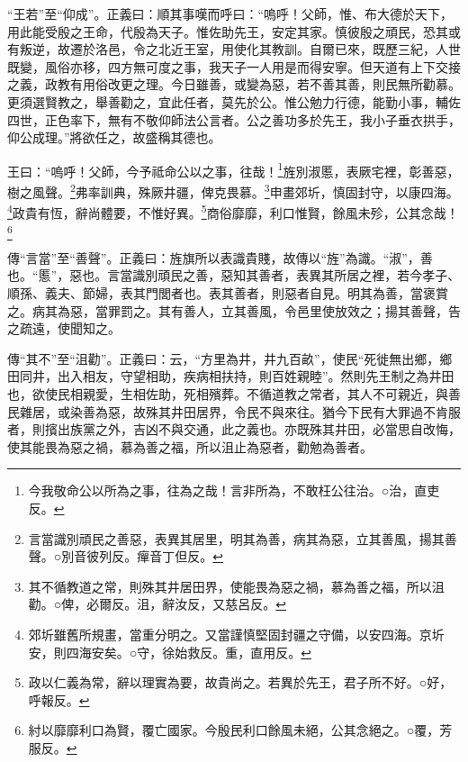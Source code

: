 {\noindent\shu{}\fzkt “王若”至“仰成”。正義曰：順其事嘆而呼曰：“嗚呼！父師，惟、布大德於天下，用此能受殷之王命，代殷為天子。惟佐助先王，安定其家。慎彼殷之頑民，恐其或有叛逆，故遷於洛邑，令之北近王室，用使化其教訓。自爾已來，既歷三紀，人世既變，風俗亦移，四方無可度之事，我天子一人用是而得安寧。但天道有上下交接之義，政教有用俗改更之理。今日雖善，或變為惡，若不善其善，則民無所勸慕。更須選賢教之，舉善勸之，宜此任者，莫先於公。惟公勉力行德，能勤小事，輔佐四世，正色率下，無有不敬仰師法公言者。公之善功多於先王，我小子垂衣拱手，仰公成理。”將欲任之，故盛稱其德也。 \par}

王曰：“嗚呼！父師，今予祗命公以之事，往哉！\footnote{今我敬命公以所為之事，往為之哉！言非所為，不敢枉公往治。○治，直吏反。}旌別淑慝，表厥宅裡，彰善惡，樹之風聲。\footnote{言當識別頑民之善惡，表異其居里，明其為善，病其為惡，立其善風，揚其善聲。○別音彼列反。癉音丁但反。}弗率訓典，殊厥井疆，俾克畏慕。\footnote{其不循教道之常，則殊其井居田界，使能畏為惡之禍，慕為善之福，所以沮勸。○俾，必爾反。沮，辭汝反，又慈呂反。}申畫郊圻，慎固封守，以康四海。\footnote{郊圻雖舊所規畫，當重分明之。又當謹慎堅固封疆之守備，以安四海。京圻安，則四海安矣。○守，徐始救反。重，直用反。}政貴有恆，辭尚體要，不惟好異。\footnote{政以仁義為常，辭以理實為要，故貴尚之。若異於先王，君子所不好。○好，呼報反。}商俗靡靡，利口惟賢，餘風未殄，公其念哉！\footnote{紂以靡靡利口為賢，覆亡國家。今殷民利口餘風未絕，公其念絕之。○覆，芳服反。}


{\noindent\zhuan{}\fzbyks 傳“言當”至“善聲”。正義曰：旌旗所以表識貴賤，故傳以“旌”為識。“淑”，善也。“慝”，惡也。言當識別頑民之善，惡知其善者，表異其所居之裡，若今孝子、順孫、義夫、節婦，表其門閭者也。表其善者，則惡者自見。明其為善，當褒賞之。病其為惡，當罪罰之。其有善人，立其善風，令邑里使放效之；揚其善聲，告之疏遠，使聞知之。 \par}

{\noindent\zhuan{}\fzbyks 傳“其不”至“沮勸”。正義曰：云，“方里為井，井九百畝”，使民“死徙無出鄉，鄉田同井，出入相友，守望相助，疾病相扶持，則百姓親睦”。然則先王制之為井田也，欲使民相親愛，生相佐助，死相殯葬。不循道教之常者，其人不可親近，與善民雜居，或染善為惡，故殊其井田居界，令民不與來往。猶今下民有大罪過不肯服者，則擯出族黨之外，吉凶不與交通，此之義也。亦既殊其井田，必當思自改悔，使其能畏為惡之禍，慕為善之福，所以沮止為惡者，勸勉為善者。 \par}

